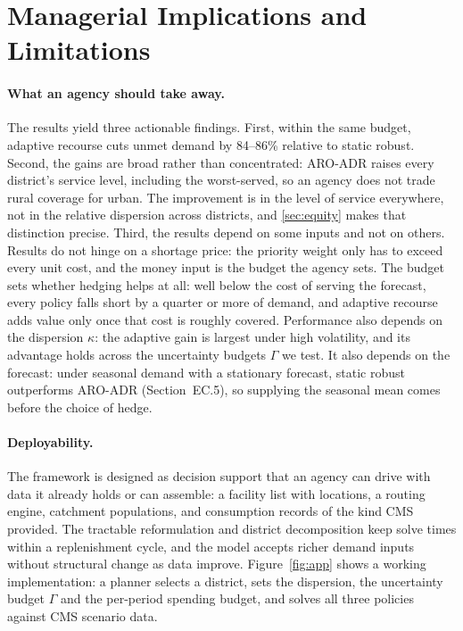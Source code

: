 \documentclass[11pt]{article}
\begin{document}
\section{Managerial Implications and Limitations}
\label{sec:discussion}

\paragraph{What an agency should take away.}
The results yield three actionable findings.
First, within the same budget, adaptive recourse cuts unmet demand by 84--86\% relative to static robust.
Second, the gains are broad rather than concentrated: ARO-ADR raises every district's service level, including the worst-served, so an agency does not trade rural coverage for urban.
The improvement is in the level of service everywhere, not in the relative dispersion across districts, and \Sec\ref{sec:equity} makes that distinction precise.
Third, the results depend on some inputs and not on others.
Results do not hinge on a shortage price: the priority weight only has to exceed every unit cost, and the money input is the budget the agency sets.
The budget sets whether hedging helps at all: well below the cost of serving the forecast, every policy falls short by a quarter or more of demand, and adaptive recourse adds value only once that cost is roughly covered.
Performance also depends on the dispersion $\kappa$: the adaptive gain is largest under high volatility, and its advantage holds across the uncertainty budgets $\Gamma$ we test.
It also depends on the forecast: under seasonal demand with a stationary forecast, static robust outperforms ARO-ADR (Section~EC.5), so supplying the seasonal mean comes before the choice of hedge.

\paragraph{Deployability.}
The framework is designed as decision support that an agency can drive with data it already holds or can assemble: a facility list with locations, a routing engine, catchment populations, and consumption records of the kind CMS provided.
The tractable reformulation and district decomposition keep solve times within a replenishment cycle, and the model accepts richer demand inputs without structural change as data improve.
Figure~\ref{fig:app} shows a working implementation: a planner selects a district, sets the dispersion, the uncertainty budget $\Gamma$ and the per-period spending budget, and solves all three policies against CMS scenario data.
\end{document}
